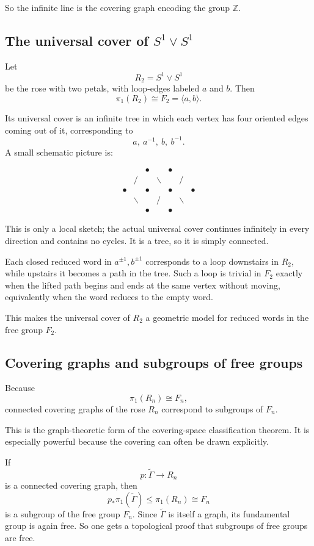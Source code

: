 \documentclass[12pt,a4paper]{article}
\theoremstyle{notespace}
\begin{document}
So the infinite line is the covering graph encoding the group \(\mathbb Z\).

\subsection{The universal cover of \(S^1\vee S^1\)}

Let
\[
R_2=S^1\vee S^1
\]
be the rose with two petals, with loop-edges labeled \(a\) and \(b\). Then
\[
\pi_1(R_2)\cong F_2=\langle a,b\rangle.
\]

Its universal cover is an infinite tree in which each vertex has four oriented edges coming out of it, corresponding to
\[
a,\ a^{-1},\ b,\ b^{-1}.
\]
A small schematic picture is:

\[
\begin{array}{ccccccc}
	&& \bullet && \bullet && \\
	& / && \backslash && / & \\
	\bullet && \bullet && \bullet && \bullet \\
	& \backslash && / && \backslash & \\
	&& \bullet && \bullet &&
\end{array}
\]

This is only a local sketch; the actual universal cover continues infinitely in every direction and contains no cycles. It is a tree, so it is simply connected.

Each closed reduced word in \(a^{\pm 1},b^{\pm 1}\) corresponds to a loop downstairs in \(R_2\), while upstairs it becomes a path in the tree. Such a loop is trivial in \(F_2\) exactly when the lifted path begins and ends at the same vertex without moving, equivalently when the word reduces to the empty word.

This makes the universal cover of \(R_2\) a geometric model for reduced words in the free group \(F_2\).

\subsection{Covering graphs and subgroups of free groups}

Because
\[
\pi_1(R_n)\cong F_n,
\]
connected covering graphs of the rose \(R_n\) correspond to subgroups of \(F_n\).

This is the graph-theoretic form of the covering-space classification theorem. It is especially powerful because the covering can often be drawn explicitly.

If
\[
p:\widetilde{\Gamma}\to R_n
\]
is a connected covering graph, then
\[
p_*\pi_1(\widetilde{\Gamma})\leq \pi_1(R_n)\cong F_n
\]
is a subgroup of the free group \(F_n\). Since \(\widetilde{\Gamma}\) is itself a graph, its fundamental group is again free. So one gets a topological proof that subgroups of free groups are free.
\end{document}
